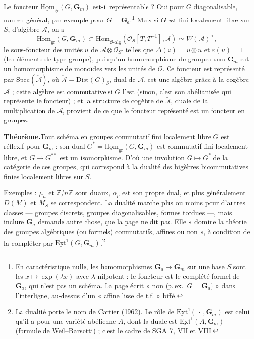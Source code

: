 \documentclass[11pt,a4paper]{article}
\begin{document}
Le foncteur $\underline{\mathrm{Hom}}_{\mathrm{gr}}(G, \mathbf{G}_{m})$
est-il représentable ? Oui pour $G$ diagonalisable, non en général, par
exemple pour $G = \mathbf{G}_{a}$.\footnote{En caractéristique nulle, les
homomorphismes $\mathbf{G}_{a} \to \mathbf{G}_{m}$ sur une base $S$ sont les
$x \mapsto \exp(\lambda x)$ avec $\lambda$ nilpotent : le foncteur est le
complété formel de $\mathbf{G}_{a}$, qui n'est pas un schéma. La page écrit
« non (p.\,ex.\ $G = \mathbf{G}_{a}$) » dans l'interligne, au-dessus d'un
« affine lisse de t.f. » biffé.}
Mais si $G$ est fini localement libre sur $S$, d'algèbre $\mathcal{A}$, on a
\[
  \underline{\mathrm{Hom}}_{\mathrm{gr}}(G, \mathbf{G}_{m}) \subset
  \underline{\mathrm{Hom}}_{\mathcal{O}\text{-alg}}(\mathcal{O}_{S}[T, T^{-1}], \mathcal{A})
  \simeq W(\mathcal{A})^{\times},
\]
le sous-foncteur des unités $u$ de $\mathcal{A} \otimes \mathcal{O}_{S'}$
telles que $\Delta(u) = u \otimes u$ et $\varepsilon(u) = 1$ (les éléments
de type groupe), puisqu'un homomorphisme de groupes vers $\mathbf{G}_{m}$ est
un homomorphisme de monoïdes vers les unités de $\mathcal{O}$. Ce foncteur
est représenté par $\mathrm{Spec}(\check{\mathcal{A}})$, où
$\check{\mathcal{A}} = \mathrm{Dist}(G)_{S}$, dual de $\mathcal{A}$, est une
algèbre grâce à la cogèbre $\mathcal{A}$ ; cette algèbre est commutative si
$G$ l'est (sinon, c'est son abélianisée qui représente le foncteur) ; et la structure de cogèbre de
$\check{\mathcal{A}}$, duale de la multiplication de $\mathcal{A}$, provient
de ce que le foncteur représenté est un foncteur en groupes.

\textbf{Théorème.}\quad Tout schéma en groupes commutatif fini localement libre $G$ est réflexif pour
$\mathbf{G}_{m}$ : son dual
$G^{*} = \underline{\mathrm{Hom}}_{\mathrm{gr}}(G, \mathbf{G}_{m})$ est
commutatif fini localement libre, et $G \to G^{**}$ est un isomorphisme.
D'où une involution $G \mapsto G^{*}$ de la catégorie de ces groupes, qui
correspond à la dualité des bigèbres bicommutatives finies localement libres
sur $S$.

Exemples : $\mu_{n}$ et $\mathbb{Z}/n\mathbb{Z}$ sont duaux, $\alpha_{p}$ est
son propre dual, et plus généralement $D(M)$ et $M_{S}$ se correspondent.
La dualité marche plus ou moins pour d'autres classes --- groupes discrets,
groupes diagonalisables, formes tordues ---, mais inclure $\mathbf{G}_{a}$
demande autre chose, que la page ne dit pas. Elle « domine la théorie des
groupes algébriques (ou formels) commutatifs, affines ou non », à condition
de la compléter par $\underline{\mathrm{Ext}}^{1}(G, \mathbf{G}_{m})$.\footnote{La
dualité porte le nom de Cartier (1962). Le rôle de
$\underline{\mathrm{Ext}}^{1}(\,\cdot\,, \mathbf{G}_{m})$ est celui qu'il a
pour une variété abélienne $A$, dont la duale est
$\underline{\mathrm{Ext}}^{1}(A, \mathbf{G}_{m})$ (formule de
Weil--Barsotti) ; c'est le cadre de SGA~7, VII et VIII.}
\end{document}
